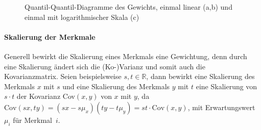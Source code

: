  \begin{figure}
  \qquad
  \qquad
  
  \caption{ Quantil-Quantil-Diagramme des Gewichts, einmal linear (a,b) und einmal mit logarithmischer Skala (c)}
  \label{qqdiagrams_weight}
 \end{figure}
 
 
 \paragraph{Skalierung der Merkmale}
 Generell bewirkt die Skalierung eines Merkmals eine Gewichtung, denn durch eine Skalierung ändert sich die (Ko-)Varianz und somit auch die Kovarianzmatrix. Seien beispielsweise $s,t \in \mathbb{R}$, dann bewirkt eine Skalierung des Merkmals $x$ mit $s$ und eine Skalierung des Merkmals $y$ mit $t$ eine Skalierung von $s \cdot t$ der Kovarianz Cov$(x,y)$ von $x$ mit $y$, da $\mathrm{Cov}(sx, ty) = (sx - s\mu_x) (ty - t\mu_y) = st \cdot \mathrm{Cov}(x,y)$, mit Erwartungswert $\mu_i$ für \mbox{Merkmal $i$}.
 
